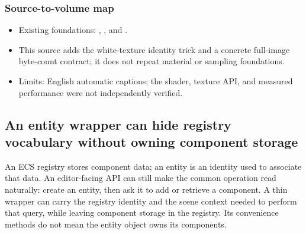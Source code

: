 \subsubsection{Source-to-volume map}\label{06-engine-ii-ch031-source-to-volume-map}

\hypertarget{06-engine-ii-ch031-source-to-volume-map}{}

\begin{itemize}
\tightlist
\item
  Existing foundations: , , and .
\item
  This source adds the white-texture identity trick and a concrete full-image byte-count contract; it does not repeat material or sampling foundations.
\item
  Limits: English automatic captions; the shader, texture API, and measured performance were not independently verified.
\end{itemize}

\subsection{An entity wrapper can hide registry vocabulary without owning component storage}\label{06-engine-ii-ch031-an-entity-wrapper-can-hide-registry-vocabulary-without-owning-component-storage}

\hypertarget{06-engine-ii-ch031-an-entity-wrapper-can-hide-registry-vocabulary-without-owning-component-storage}{}

An ECS registry stores component data; an entity is an identity used to associate that data. An editor-facing API can still make the common operation read naturally: create an entity, then ask it to add or retrieve a component. A thin wrapper can carry the registry identity and the scene context needed to perform that query, while leaving component storage in the registry. Its convenience methods do not mean the entity object owns its components.

